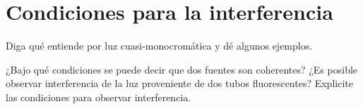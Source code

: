 \section*{Condiciones para la interferencia}

\item Diga qué entiende por luz cuasi-monocromática y dé algunos ejemplos.


\item ¿Bajo qué condiciones se puede decir que dos fuentes son coherentes?
¿Es posible observar interferencia de la luz proveniente de dos tubos fluorescentes?
Explicite las condiciones para observar interferencia.
